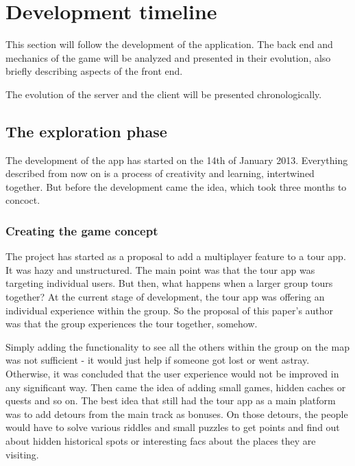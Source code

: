 \section{Development timeline}

This section will follow the development of the application. The back end and
mechanics of the game will be analyzed and presented in their evolution,
also briefly describing aspects of the front end. \newline

The evolution of the server and the client will be presented chronologically.

\subsection{The exploration phase}

The development of the app has started on the 14th of January 2013. Everything
described from now on is a process of creativity and learning, intertwined
together. But before the development came the idea, which took three months to
concoct.\newline


\subsubsection{Creating the game concept}

The project has started as a proposal to add a multiplayer feature to a tour
app. It was hazy and unstructured. The main point was that the tour app was
targeting individual users. But then, what happens when a larger group tours
together? At the current stage of development, the tour app was offering an
individual experience within the group. So the proposal of this paper's author
was that the group experiences the tour together, somehow. \newline

Simply adding the functionality to see all the others within the group on the
map was not sufficient - it would just help if someone got lost or went astray.
Otherwise, it was concluded that the user experience would not be improved in
any significant way. Then came the idea of adding small games, hidden caches or
quests and so on. The best idea that still had the tour app as a main platform
was to add detours from the main track as bonuses. On those detours, the people
would have to solve various riddles and small puzzles to get points and find out
about hidden historical spots or interesting facs about the places they are
visiting. \newline

